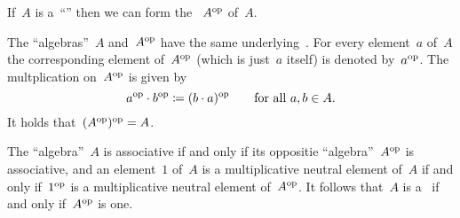 % 
% 


\begin{recall}
  If~$A$ is a~\enquote{\algebra{$\kf$}} then we can form the ~$A^{\mathrm{op}}$ of~$A$.

  The \enquote{algebras}~$A$ and~$A^{\mathrm{op}}$ have the same underlying~\vectorspace{$\kf$}.
  For every element~$a$ of~$A$ the corresponding element of~$A^{\mathrm{op}}$ (which is just~$a$ itself) is denoted by~$a^{\mathrm{op}}$.
  The multplication on~$A^{\mathrm{op}}$ is given by
  \[
    a^{\mathrm{op}} \cdot b^{\mathrm{op}}
    \coloneqq
    (b \cdot a)^{\mathrm{op}}
    \qquad
    \text{for all~$a, b \in A$.}
  \]
  It holds that~$(A^{\mathrm{op}})^{\mathrm{op}} = A$.

  The \enquote{algebra}~$A$ is associative if and only if its oppositie \enquote{algebra}~$A^{\mathrm{op}}$ is associative, and an element~$1$ of~$A$ is a multiplicative neutral element of~$A$ if and only if~$1^{\mathrm{op}}$ is a multiplicative neutral element of~$A^{\mathrm{op}}$.
  It follows that~$A$ is a~{\algebra{$\kf$}} if and only if~$A^{\mathrm{op}}$ is one.
\end{recall}


